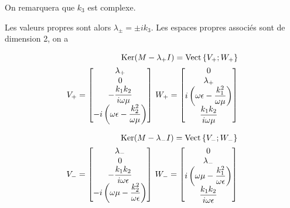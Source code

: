 On remarquera que $k_3$ est complexe.

Les valeurs propres sont alors $\lambda_\pm = \pm i k_3$. Les espaces propres associés sont de dimension 2, on a 

\begin{align}
\operatorname{Ker}(M-\lambda_+I)=\operatorname{Vect}\left\lbrace V_+;W_+\right\rbrace \\
    V_+ = 
    \begin{bmatrix}
    \lambda_+ \\
        0 \\
        -\dfrac{k_1k_2}{i\omega\mu} \\
        -i\left(\omega\epsilon - \dfrac{k_2^2}{\omega\mu}\right) \\
    \end{bmatrix}
    \,
    W_+ = 
        \begin{bmatrix}
        0 \\
        \lambda_+ \\
        i\left(\omega\epsilon - \dfrac{k_1^2}{\omega\mu}\right) \\
        \dfrac{k_1k_2}{i\omega\mu} \\
    \end{bmatrix}
\end{align}

\begin{align}
\operatorname{Ker}(M-\lambda_-I)=\operatorname{Vect}\left\lbrace V_-;W_-\right\rbrace\\
    V_- = 
    \begin{bmatrix}
        \lambda_- \\
        0 \\
        -\dfrac{k_1k_2}{i\omega\epsilon} \\
        -i\left(\omega\mu - \dfrac{k_2^2}{\omega\epsilon}\right) \\
    \end{bmatrix}
    \,
    W_- = 
    \begin{bmatrix}
        0 \\
        \lambda_- \\
        i\left(\omega\mu - \dfrac{k_1^2}{\omega\epsilon}\right) \\
        \dfrac{k_1k_2}{i\omega\epsilon} \\
    \end{bmatrix}
\end{align}


